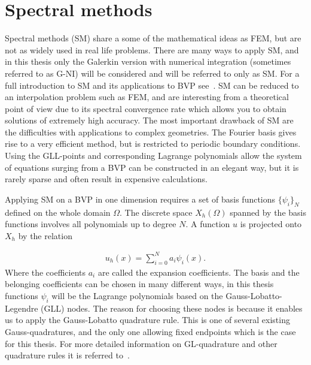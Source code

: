 
\section{Spectral methods} \label{sm}
Spectral methods (SM) share a some of the mathematical ideas as FEM, but are not as widely used in real life problems. 
There are many ways to apply SM, 
and in this thesis only the Galerkin version with numerical integration (sometimes referred to as G-NI) will be considered and will be referred to only as SM. 
For a full introduction to SM and its applications to BVP see~\cite{Canuto}.
SM can be reduced to an interpolation problem such as FEM, and are interesting from a theoretical point of view due to its 
spectral convergence rate which allows you to obtain solutions of extremely high accuracy. 
The most important drawback of SM are the difficulties with applications to complex geometries. The Fourier basis
gives rise to a very efficient method, but is restricted to periodic boundary conditions. Using the GLL-points and
corresponding Lagrange polynomials allow the system of equations surging from
a BVP can be constructed in an elegant way, but it is rarely sparse and often result in expensive calculations. 

Applying SM on a BVP in one dimension requires a set of basis functions $\{\psi_i\}_N$ defined on the whole domain $\Omega$. 
The discrete space $X_h(\Omega)$ spanned by the basis functions involves all polynomials up to degree $N$.
A function $u$ is projected onto $X_h$ by the relation

\begin{align}
    u_h(x) = \sum_{i=0}^N a_i\psi_i(x).
    \label{eq:spectralprojection}
\end{align}
Where the coefficients $a_i$ are called the expansion coefficients. The basis and the belonging coefficients can be chosen in many different ways, 
in this thesis functions $\psi_i$ will be the Lagrange polynomials based on the Gauss-Lobatto-Legendre (GLL) nodes. 
The reason for choosing these nodes is because it enables us to apply the Gauss-Lobatto quadrature 
rule. This is one of several existing Gauss-quadratures, and the only one allowing fixed 
endpoints which is the case for this thesis. For more detailed information on GL-quadrature and 
other quadrature rules it is referred to~\cite{SM}.

